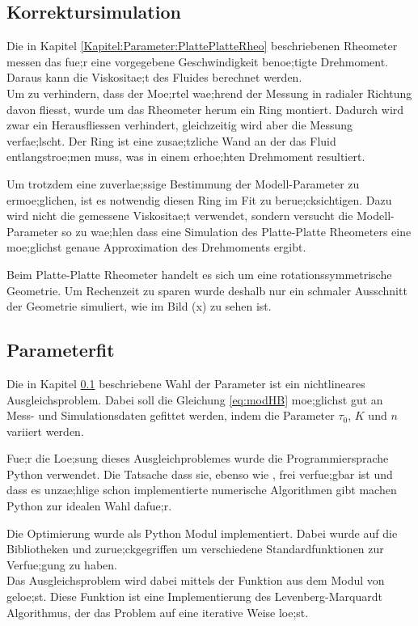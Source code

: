 \subsection{Korrektursimulation}
\label{Kapitel:Korrektursimulation}
Die in Kapitel \ref{Kapitel:Parameter:PlattePlatteRheo} beschriebenen Rheometer messen das fue;r eine vorgegebene Geschwindigkeit benoe;tigte Drehmoment. Daraus kann die Viskositae;t des Fluides berechnet werden.\\
Um zu verhindern, dass der Moe;rtel wae;hrend der Messung in radialer Richtung davon fliesst, wurde um das Rheometer herum ein Ring montiert. Dadurch wird zwar ein Herausfliessen verhindert, gleichzeitig wird aber die Messung verfae;lscht. Der Ring ist eine zusae;tzliche Wand an der das Fluid entlangstroe;men muss, was in einem erhoe;hten Drehmoment resultiert.

Um trotzdem eine zuverlae;ssige Bestimmung der Modell-Parameter zu ermoe;glichen, ist es notwendig diesen Ring im Fit zu berue;cksichtigen. Dazu wird nicht die gemessene Viskositae;t verwendet, sondern versucht die Modell-Parameter so zu wae;hlen dass eine Simulation des Platte-Platte Rheometers eine moe;glichst genaue Approximation des Drehmoments ergibt.

Beim Platte-Platte Rheometer handelt es sich um eine rotationssymmetrische Geometrie. Um Rechenzeit zu sparen wurde deshalb nur ein schmaler Ausschnitt der Geometrie simuliert, wie im Bild (x)  zu sehen ist.\\
%
\subsection{Parameterfit}
Die in Kapitel \ref{Kapitel:Korrektursimulation} beschriebene Wahl der Parameter ist ein nichtlineares Ausgleichsproblem. Dabei soll die Gleichung \eqref{eq:modHB} moe;glichst gut an Mess- und Simulationsdaten gefittet werden, indem die Parameter $\tau_0$, $K$ und $n$ variiert werden.

Fue;r die Loe;sung dieses Ausgleichproblemes wurde die Programmiersprache Python verwendet. Die Tatsache dass sie, ebenso wie \openfoam{}, frei verfue;gbar  ist und dass es unzae;hlige schon implementierte numerische Algorithmen gibt machen Python zur idealen Wahl dafue;r.

Die Optimierung wurde als Python Modul  implementiert. Dabei wurde auf die Bibliotheken  und   zurue;ckgegriffen um verschiedene Standardfunktionen zur Verfue;gung zu haben.\\
Das Ausgleichsproblem wird dabei mittels der Funktion  aus dem Modul  von  geloe;st. Diese Funktion ist eine Implementierung des Levenberg-Marquardt Algorithmus, der das Problem auf eine iterative Weise loe;st.

